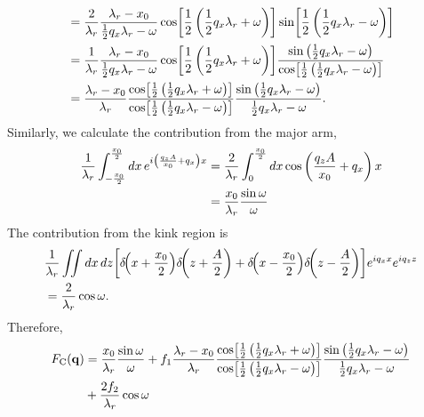 \begin{align}
  &= \frac{2}{\lambda_r}\frac{\lambda_r-x_0}{\frac{1}{2}q_x\lambda_r - \omega} 
     \cos\mathopen{}\left[ \frac{1}{2}\left(\frac{1}{2}q_x\lambda_r + \omega\right) \right]\mathclose{} 
     \sin\mathopen{}\left[ \frac{1}{2}\left(\frac{1}{2}q_x\lambda_r - \omega\right) \right]\mathclose{} \nonumber\\
  &= \frac{1}{\lambda_r}\frac{\lambda_r-x_0}{\frac{1}{2}q_x\lambda_r - \omega} 
     \cos\mathopen{}\left[ \frac{1}{2}\left(\frac{1}{2}q_x\lambda_r + \omega\right) \right]\mathclose{} 
     \frac{\sin\left(\frac{1}{2}q_x\lambda_r - \omega \right)}
          {\cos\mathopen{}\left[ \frac{1}{2}\left(\frac{1}{2}q_x\lambda_r - \omega\right) \right]\mathclose{}} \nonumber\\
  &= \frac{\lambda_r-x_0}{\lambda_r}
     \frac{\cos\mathopen{}\left[ \frac{1}{2}\left(\frac{1}{2}q_x\lambda_r + \omega\right) \right]\mathclose{}}
          {\cos\mathopen{}\left[ \frac{1}{2}\left(\frac{1}{2}q_x\lambda_r - \omega\right) \right]\mathclose{}}
     \frac{\sin\left(\frac{1}{2}q_x\lambda_r - \omega\right)}
          {\frac{1}{2}q_x\lambda_r - \omega}.
\end{align}
Similarly, we calculate the contribution from the major arm,
\begin{align}
  \frac{1}{\lambda_r}\int_{-\frac{x_0}{2}}^{\frac{x_0}{2}}\mathop{dx} 
  e^{i\left(\frac{q_zA}{x_0} + q_x \right)x}
  &= \frac{2}{\lambda_r}\int_{0}^{\frac{x_0}{2}}\mathop{dx} \cos\left(\frac{q_zA}{x_0} + q_x\right)x \nonumber\\ 
  &= \frac{x_0}{\lambda_r}\frac{\sin\omega}{\omega}
\end{align}
The contribution from the kink region is 
\begin{align}
  & \frac{1}{\lambda_r}\iint\mathop{dx}\mathop{dz}
  \mathopen{}\left[ \delta\!\mathopen{}\left( x+\frac{x_0}{2} \right)\mathclose{}\delta\!\mathopen{}\left( z+\frac{A}{2} \right)\mathclose{} 
   + \delta\!\mathopen{}\left( x-\frac{x_0}{2} \right)\mathclose{}\delta\!\mathopen{}\left( z-\frac{A}{2} \right)\mathclose{} \right]\mathclose{}
  e^{iq_xx} e^{iq_zz} \nonumber\\
  &= \frac{2}{\lambda_r}\cos\omega.
\end{align}
Therefore,
\begin{align}
  F_\mathrm{C}(\mathbf{q}) 
  &= \frac{x_0}{\lambda_r}\frac{\sin\omega}{\omega} + 
  f_1\frac{\lambda_r-x_0}{\lambda_r}
  \frac{\cos\mathopen{}\left[ \frac{1}{2}\left(\frac{1}{2}q_x\lambda_r + \omega\right) \right]\mathclose{}}
       {\cos\mathopen{}\left[ \frac{1}{2}\left(\frac{1}{2}q_x\lambda_r - \omega\right) \right]\mathclose{}}
  \frac{\sin\left(\frac{1}{2}q_x\lambda_r - \omega\right)}
       {\frac{1}{2}q_x\lambda_r - \omega} \nonumber\\
  &+ \frac{2f_2}{\lambda_r}\cos\omega
\end{align}

